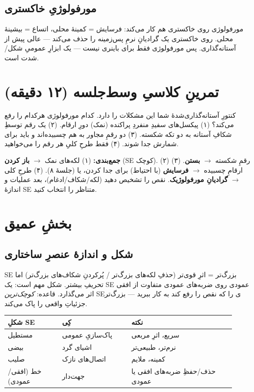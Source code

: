 \documentclass[12pt,a4paper]{article}
\begin{document}
\subsection{مورفولوژیِ خاکستری}

مورفولوژی روی خاکستری هم کار می‌کند: فرسایش = کمینهٔ محلی، اتساع = بیشینهٔ محلی.  روی
خاکستری یک گرادیانِ نرمِ پس‌زمینه را حذف می‌کند — عالی پیش از آستانه‌گذاری. پس مورفولوژی فقط برای
باینری نیست — یک ابزارِ عمومیِ شکل/شدت است.

\section{تمرینِ کلاسیِ وسط‌جلسه (۱۲ دقیقه)}

\begin{tamrin}
کنتورِ آستانه‌گذاری‌شدهٔ شما این مشکلات را دارد. کدام مورفولوژی هرکدام را رفع می‌کند؟ (۱) پیکسل‌های
سفیدِ منفردِ پراکنده (نمک) دورِ ارقام. (۲) یک رقم توسطِ شکافِ آستانه به دو تکه شکسته. (۳) دو رقمِ
مجاور به هم چسبیده‌اند و باید برای شمارش جدا شوند. (۴) فقط طرحِ کلیِ هر رقم را می‌خواهید.
\end{tamrin}

\textbf{جمع‌بندی:} (۱) لکه‌های نمک $\rightarrow$ \textbf{باز کردن} (SE کوچک). (۲) رقمِ شکسته
$\rightarrow$ \textbf{بستن}. (۳) ارقامِ چسبیده $\rightarrow$ \textbf{فرسایش} (با احتیاط) برای جدا
کردن، یا  (جلسهٔ ۸). (۴) طرحِ کلی $\rightarrow$ \textbf{گرادیانِ مورفولوژیک}. نقص را
تشخیص دهید (لکه/شکاف/ادغام)، بعد عملیات و اندازهٔ SE متناظر را انتخاب کنید.

\section{بخشِ عمیق}

\subsection{شکل و اندازهٔ عنصرِ ساختاری}

SEِ بزرگ‌تر = اثرِ قوی‌تر (حذفِ لکه‌های بزرگ‌تر / پُرکردنِ شکاف‌های بزرگ‌تر) اما تحریفِ بیشتر. شکل
مهم است: یک SEِ عمودی روی ضربه‌های عمودی متفاوت از افقی اثر می‌گذارد. قاعده: \emph{کوچک‌ترین}
SEی را که نقص را رفع کند به کار ببرید — بزرگ‌تر جزئیاتِ واقعی را پاک می‌کند.

\begin{center}
\begin{tabular}{>{\raggedright\arraybackslash}p{0.22\linewidth} >{\raggedright\arraybackslash}p{0.28\linewidth} >{\raggedright\arraybackslash}p{0.42\linewidth}}
\toprule
\textbf{شکلِ SE} & \textbf{کِی} & \textbf{نکته} \\
\midrule
مستطیل & پاک‌سازیِ عمومی & سریع، اثرِ مربعی \\
بیضی & اشیای گرد & نرم‌تر، طبیعی‌تر \\
صلیب & اتصال‌های نازک & کمینه، ملایم \\
خط (افقی/عمودی) & جهت‌دار & حذف/حفظِ ضربه‌های افقی یا عمودی \\
\bottomrule
\end{tabular}
\end{center}
\end{document}
